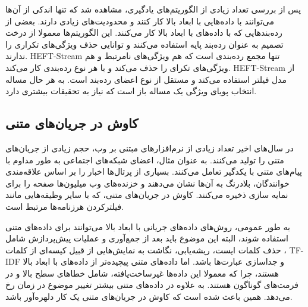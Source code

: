 پس از بررسی تعداد زیادی از الگوریتم‌های یادگیری، مشاهده شد که تنها اندکی از آن‌ها می‌توانند با داده‌هایی با ابعاد بالا کار کنند و محدودیت‌های زیادی دارند. بعضی از رده‌بندهایی که با داده‌های با ابعاد بالا کار می‌کنند. این الگوریتم‌ها معمولا از درخت تصمیم به عنوان رده‌بند پایه استفاده می‌کنند و توانایی حذف ویژگی‌های تکراری را ندارند. HEFT-Stream تنها مجمع رده‌بندی است که هم ویژگی‌های نامرتبط و هم ویژگی‌های تکرای را حذف می‌کند و با هر نوع رده‌بندی کار می‌کند. HEFT-Stream از مدل فیلتر استفاده می‌کند و مستقل از نوع اعضای رده‌بند است. به هر حال مساله انتخاب پویای ویژگی یک مساله باز است که نیاز به تحقیقات بیشتری دارد.


\subsection{کاوش در جریان‌های متنی}
در سال‌های اخیر تعداد زیادی از نرم‌افزار‌های مبتنی بر وب، حجم زیادی از جریان‌های متنی را تولید می‌کنند. به عنوان مثال، اعضای شبکه‌های اجتماعی به طور مداوم با پیام‌های متنی با یکدگیر تعامل می‌کنند. بسیاری از پرتال‌ها اخبار را بر اساس علاقه‌مندی خوانندگان، بلادرنگ به آن‌ها نشان می‌دهند و خزنده‌های وب میلیون‌ها صفحه را برای نمایه سازی ذخیره می‌کنند. کاوش در جریان‌های متنی، که با سایر وظیفه‌هایی مانند فیلترکردن هرزنامه‌ها مرتبط است.

به طور عمومی، روش‌های داده‌های جریانی با ابعاد بالا می‌توانند برای داده‌های متنی استفاده شوند، البته این موضوع باید بعد از جمع‌آوری و عملیات پیش‌پردازش شامل حذف کلمات ایست، ریشه‌یابی، نگاشت به نمایش‌هایی از قبیل کیسه‌ای از کلمات
، TF-IDF
و جداسازی عبارت‌ها باشد. اما داده‌های متنی پیچیده‌تر از داده‌های با ابعاد بالا هستند، چرا که معمولا این داده‌ها غیرساخت‌یافته، شامل خطاهای سطح بالا و در فرمت‌های گوناگون هستند. به علاوه در داده‌های متنی بیشتر تغییر موضوع در زمان رخ می‌دهد. همین باعث شده است که کاوش در جریان‌های متنی یک کار دلهره‌آور باشد.

